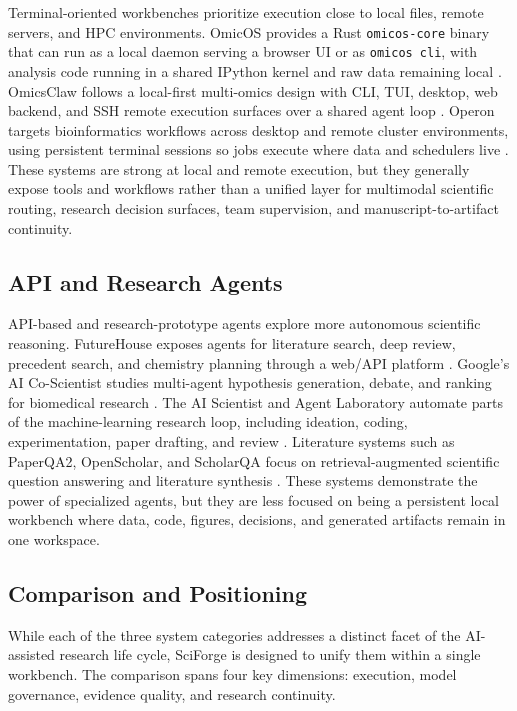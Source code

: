 \documentclass[sn-basic,Numbered,pdflatex]{sn-jnl}
\begin{document}
Terminal-oriented workbenches prioritize execution close to local files, remote servers, and HPC environments. OmicOS provides a Rust \texttt{omicos-core} binary that can run as a local daemon serving a browser UI or as \texttt{omicos cli}, with analysis code running in a shared IPython kernel and raw data remaining local \cite{omicOSOverview2026,omicOSServe2026,omicOSCLI2026}. OmicsClaw follows a local-first multi-omics design with CLI, TUI, desktop, web backend, and SSH remote execution surfaces over a shared agent loop \cite{omicsClaw2026}. Operon targets bioinformatics workflows across desktop and remote cluster environments, using persistent terminal sessions so jobs execute where data and schedulers live \cite{operonGitHub2026}. These systems are strong at local and remote execution, but they generally expose tools and workflows rather than a unified layer for multimodal scientific routing, research decision surfaces, team supervision, and manuscript-to-artifact continuity.

\subsection{API and Research Agents}

API-based and research-prototype agents explore more autonomous scientific reasoning. FutureHouse exposes agents for literature search, deep review, precedent search, and chemistry planning through a web/API platform \cite{futureHousePlatform2025}. Google's AI Co-Scientist studies multi-agent hypothesis generation, debate, and ranking for biomedical research \cite{googleCoScientist2025}. The AI Scientist and Agent Laboratory automate parts of the machine-learning research loop, including ideation, coding, experimentation, paper drafting, and review \cite{sakanaAIScientist2024,agentLaboratory2025}. Literature systems such as PaperQA2, OpenScholar, and ScholarQA focus on retrieval-augmented scientific question answering and literature synthesis \cite{paperQA2024,openScholar2024,scholarQA2025}. These systems demonstrate the power of specialized agents, but they are less focused on being a persistent local workbench where data, code, figures, decisions, and generated artifacts remain in one workspace.

\subsection{Comparison and Positioning}

While each of the three system categories addresses a distinct facet of the AI-assisted research life cycle, SciForge is designed to unify them within a single workbench. The comparison spans four key dimensions: execution, model governance, evidence quality, and research continuity.
\end{document}
